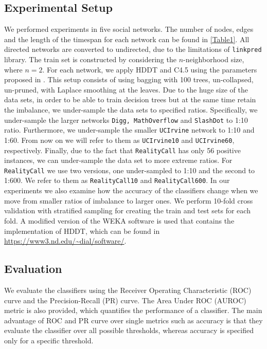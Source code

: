 \documentclass{acm_proc_article-sp}
\begin{document}
\subsection{Experimental Setup}
We performed experiments in five social networks. The number of nodes, edges and the length of the timespan for each network can be found in \autoref{Table1}. All directed networks are converted to undirected, due to the limitations of \texttt{linkpred} library. The train set is constructed by considering the $n$-neighborhood size, where $n = 2$. For each network, we apply HDDT and C4.5 using the parameters proposed in \cite{Cieslak2012}. This setup consists of using bagging with 100 trees, un-collapsed, un-pruned, with Laplace smoothing at the leaves. Due to the huge size of the data sets, in order to be able to train decision trees but at the same time retain the imbalance, we under-sample the data sets to specified ratios. Specifically, we under-sample the larger networks \texttt{Digg, MathOverflow} and \texttt{SlashDot} to 1:10 ratio. Furthermore, we under-sample the smaller \texttt{UCIrvine} network to 1:10 and 1:60. From now on we will refer to them as \texttt{UCIrvine10} and \texttt{UCIrvine60}, respectively. Finally, due to the fact that \texttt{RealityCall} has only 56 positive instances, we can under-sample the data set to more extreme ratios. For \texttt{RealityCall} we use two versions, one under-sampled to 1:10 and the second to 1:600. We refer to them as \texttt{RealityCall10} and \texttt{RealityCall600}. In our experiments we also examine how the accuracy of the classifiers change when we move from smaller ratios of imbalance to larger ones. We perform 10-fold cross validation with stratified sampling for creating the train and test sets for each fold. A modified version of the WEKA software \cite{witten2016data} is used that contains the implementation of HDDT, which can be found in \url{https://www3.nd.edu/~dial/software/}. 

\subsection{Evaluation}
We evaluate the classifiers using the Receiver Operating Characteristic (ROC) curve and the Precision-Recall (PR) curve. The Area Under ROC (AUROC) metric is also provided, which quantifies the performance of a classifier. The main advantage of ROC and PR curve over single metrics such as accuracy is that they evaluate the classifier over all possible thresholds, whereas accuracy is specified only for a specific threshold. 
\end{document}
